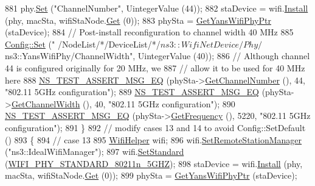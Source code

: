 \begin{DoxyCode}
881     phy.\hyperlink{classns3_1_1WifiPhyHelper_a2527d6d7b29f717fd7436166c5f05f1a}{Set} (\textcolor{stringliteral}{"ChannelNumber"}, UintegerValue (44));
882     staDevice = wifi.\hyperlink{classns3_1_1WifiHelper_a451b3d33fa1497c22f06c5451f57a127}{Install} (phy, macSta, wifiStaNode.\hyperlink{classns3_1_1NodeContainer_a9ed96e2ecc22e0f5a3d4842eb9bf90bf}{Get} (0));
883     phySta = \hyperlink{classSetChannelFrequencyTest_aa30a0a39f98c2d825152681ba8b9f4e1}{GetYansWifiPhyPtr} (staDevice);
884     \textcolor{comment}{// Post-install reconfiguration to channel width 40 MHz}
885     \hyperlink{group__config_gadce03667ec621d64ce4aace85d9bcfd0}{Config::Set} (\textcolor{stringliteral}{"
      /NodeList/*/DeviceList/*/$ns3::WifiNetDevice/Phy/$ns3::YansWifiPhy/ChannelWidth"}, UintegerValue (40));
886     \textcolor{comment}{// Although channel 44 is configured originally for 20 MHz, we}
887     \textcolor{comment}{// allow it to be used for 40 MHz here}
888     \hyperlink{group__testing_ga2a9d78cffb3db8e867c35fff0b698cf5}{NS\_TEST\_ASSERT\_MSG\_EQ} (phySta->\hyperlink{classns3_1_1WifiPhy_a5cf0ccf06109ace61db51c83e91b7e8d}{GetChannelNumber} (), 44, \textcolor{stringliteral}{"802.11
       5GHz configuration"});
889     \hyperlink{group__testing_ga2a9d78cffb3db8e867c35fff0b698cf5}{NS\_TEST\_ASSERT\_MSG\_EQ} (phySta->\hyperlink{classns3_1_1WifiPhy_a4a5d5009b3b3308f2baeed42a2007189}{GetChannelWidth} (), 40, \textcolor{stringliteral}{"802.11 5GHz
       configuration"});
890     \hyperlink{group__testing_ga2a9d78cffb3db8e867c35fff0b698cf5}{NS\_TEST\_ASSERT\_MSG\_EQ} (phySta->\hyperlink{classns3_1_1WifiPhy_ad2508d94faf22d690d6b8b4367934fd1}{GetFrequency} (), 5220, \textcolor{stringliteral}{"802.11 5GHz
       configuration"});
891   \}
892   \textcolor{comment}{// modify cases 13 and 14 to avoid Config::SetDefault ()}
893   \{
894     \textcolor{comment}{// case 13}
895     \hyperlink{classns3_1_1WifiHelper}{WifiHelper} wifi;
896     wifi.\hyperlink{classns3_1_1WifiHelper_a3d01b178aeb2de246ab5a3aa5638ce24}{SetRemoteStationManager} (\textcolor{stringliteral}{"ns3::IdealWifiManager"});
897     wifi.\hyperlink{classns3_1_1WifiHelper_aa54f3e61527ef8de318d310045bc5dfd}{SetStandard} (\hyperlink{group__wifi_gga1299834f4e1c615af3ca738033b76a49aaabe94a0be4668583c42595437b4a6c0}{WIFI\_PHY\_STANDARD\_80211n\_5GHZ});
898     staDevice = wifi.\hyperlink{classns3_1_1WifiHelper_a451b3d33fa1497c22f06c5451f57a127}{Install} (phy, macSta, wifiStaNode.\hyperlink{classns3_1_1NodeContainer_a9ed96e2ecc22e0f5a3d4842eb9bf90bf}{Get} (0));
899     phySta = \hyperlink{classSetChannelFrequencyTest_aa30a0a39f98c2d825152681ba8b9f4e1}{GetYansWifiPhyPtr} (staDevice);

\end{DoxyCode}
